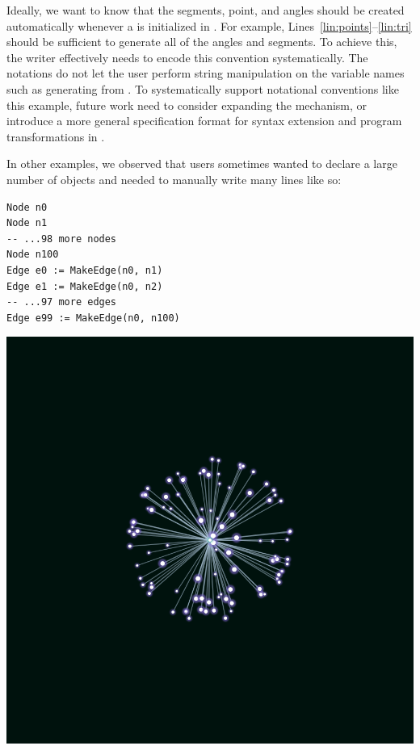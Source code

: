 Ideally, we want \Penrose to know that the segments, point, and angles should be created automatically whenever a  is initialized in \Substance. For example, Lines~\ref{lin:points}--\ref{lin:tri} should be sufficient to generate all of the angles and segments. To achieve this, the \Domain{} writer effectively needs to encode this convention systematically. The \Domain{} notations do not let the user perform string manipulation on the variable names such as generating  from . To systematically support notational conventions like this example, future work need to consider expanding the  mechanism, or introduce a more general specification format for syntax extension and program transformations in \Domain{}.

In other examples, we observed that \Substance{} users sometimes wanted to declare a large number of objects and needed to manually write many lines like so:

\vspace{1em}
\begin{minipage}{.45\linewidth}
\begin{mdframed}[style=SUBCode]
\begin{lstlisting}[language=Sub-graph,escapechar=@]
Node n0
Node n1
-- ...98 more nodes
Node n100
Edge e0 := MakeEdge(n0, n1)
Edge e1 := MakeEdge(n0, n2)
-- ...97 more edges
Edge e99 := MakeEdge(n0, n100)
\end{lstlisting}
\end{mdframed}
\end{minipage}\hfill
\begin{minipage}{.45\linewidth}
   \includegraphics[width=\linewidth]{assets/penrose/star-graph.png} 
\end{minipage}
\vspace{1em}

